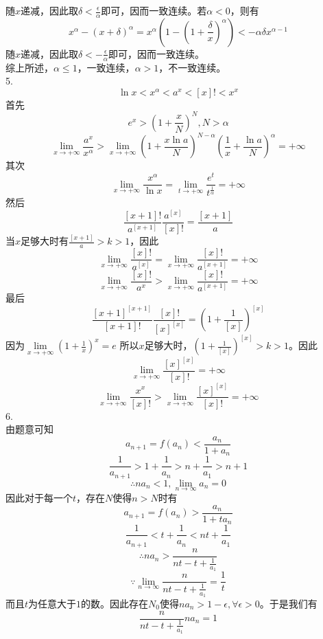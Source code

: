 \documentclass[utf8]{ctexart}
\begin{document}
随$x$递减，因此取$\delta<\frac{\epsilon}{\alpha}$即可，因而一致连续。若$\alpha<0$，则有
\[x^\alpha-(x+\delta)^\alpha=x^\alpha(1-(1+\frac{\delta}{x})^\alpha)<-\alpha\delta x^{\alpha-1}\]
随$x$递减，因此取$\delta<-\frac{\epsilon}{\alpha}$即可，因而一致连续。\\
综上所述，$\alpha\le1$，一致连续，$\alpha>1$，不一致连续。\\
5.\\
\[\ln x<x^\alpha<a^x<[x]!<x^x\]
首先
\[e^x>(1+\frac{x}{N})^N,N>\alpha\]
\[\lim\limits_{x\rightarrow+\infty}\frac{a^x}{x^\alpha}>\lim\limits_{x\rightarrow+\infty}(1+\frac{x\ln a}{N})^{N-\alpha}(\frac{1}{x}+\frac{\ln a}{N})^\alpha=+\infty\]
其次
\[\lim\limits_{x\rightarrow+\infty}\frac{x^\alpha}{\ln x}=\lim\limits_{t\rightarrow+\infty}\frac{e^t}{t^\frac{1}{\alpha}}=+\infty\]
然后
\[\frac{[x+1]!}{a^{[x+1]}}\frac{a^{[x]}}{[x]!}=\frac{[x+1]}{a}\]
当$x$足够大时有$\frac{[x+1]}{a}>k>1$，因此
\[\lim\limits_{x\rightarrow+\infty}\frac{[x]!}{a^{[x]}}=\lim\limits_{x\rightarrow+\infty}\frac{[x]!}{a^{[x+1]}}=+\infty\]
\[\lim\limits_{x\rightarrow+\infty}\frac{[x]!}{a^x}>\lim\limits_{x\rightarrow+\infty}\frac{[x]!}{a^{[x+1]}}=+\infty\]
最后
\[\frac{[x+1]^{[x+1]}}{[x+1]!}\frac{[x]!}{[x]^{[x]}}=(1+\frac{1}{[x]})^{[x]}\]
因为$\lim\limits_{x\rightarrow+\infty}(1+\frac{1}{x})^x=e$
所以$x$足够大时，$(1+\frac{1}{[x]})^{[x]}>k>1$。因此
\[\lim\limits_{x\rightarrow+\infty}\frac{[x]^{[x]}}{[x]!}=+\infty\]
\[\lim\limits_{x\rightarrow+\infty}\frac{x^x}{[x]!}>\lim\limits_{x\rightarrow+\infty}\frac{[x]^{[x]}}{[x]!}=+\infty\]
6.\\
由题意可知
\[a_{n+1}=f(a_n)<\frac{a_n}{1+a_n}\]
\[\frac{1}{a_{n+1}}>1+\frac{1}{a_n}>n+\frac{1}{a_1}>n+1\]
\[\therefore na_n<1,\lim\limits_{n\rightarrow\infty}a_n=0\]
因此对于每一个$t$，存在$N$使得$n>N$时有
\[a_{n+1}=f(a_n)>\frac{a_n}{1+ta_n}\]
\[\frac{1}{a_{n+1}}<t+\frac{1}{a_n}<nt+\frac{1}{a_1}\]
\[\therefore na_n>\frac{n}{nt-t+\frac{1}{a_1}}\]
\[\because\lim\limits_{n\rightarrow\infty}\frac{n}{nt-t+\frac{1}{a_1}}=\frac{1}{t}\]
而且$t$为任意大于$1$的数。因此存在$N_0$使得$na_n>1-\epsilon,\forall\epsilon>0$。于是我们有
\[\frac{n}{nt-t+\frac{1}{a_1}}na_n=1\]
\end{document}
